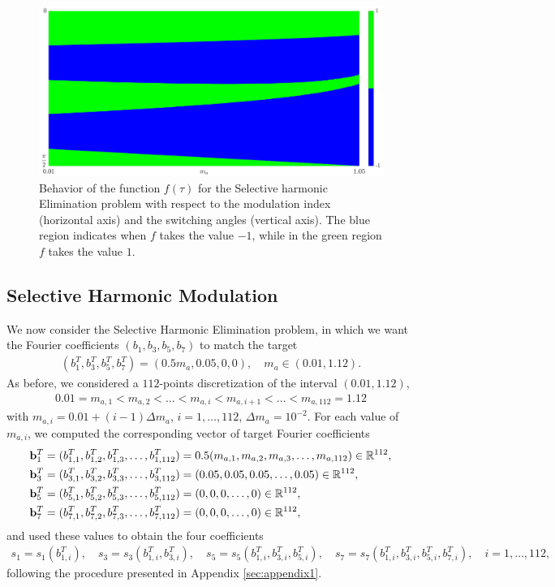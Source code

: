 \documentclass[a4paper]{article}
\numberwithin{equation}{section}
\begin{document}
\begin{figure}
	\centering 
	\includegraphics[scale=0.25]{anglesElimination}
	\caption{Behavior of the function $f(\tau)$ for the Selective harmonic Elimination problem with respect to the modulation index (horizontal axis) and the switching angles (vertical axis). The blue region indicates when $f$ takes the value $-1$, while in the green region $f$ takes the value $1$.}\label{fig:anglesElimination}
\end{figure}

\subsection{Selective Harmonic Modulation}

We now consider the Selective Harmonic Elimination problem, in which we want the Fourier coefficients $(b_1,b_3,b_5,b_7)$ to match the target 
\begin{align*}
	(b_1^T,b_3^T,b_5^T,b_7^T) = (0.5m_a,0.05,0,0), \quad m_a\in (0.01,1.12).	
\end{align*}
As before, we considered a $112$-points discretization of the interval $(0.01,1.12)$, 
\begin{align*}
	0.01 = m_{a,1}< m_{a,2} < \ldots < m_{a,i} < m_{a,i+1} < \ldots < m_{a,112} = 1.12
\end{align*}
with $m_{a,i} = 0.01 + (i-1)\Delta m_a$, $i=1,\ldots,112$, $\Delta m_a=10^{-2}$. For each value of $m_{a,i}$, we computed the corresponding vector of target Fourier coefficients
\begin{align*}
	&{\bf{b}}^T_1 =(b_{1,1}^T,b_{1,2}^T,b_{1,3}^T,\ldots, b_{1,112}^T) = 0.5(m_{a,1},m_{a,2},m_{a,3},\ldots,m_{a,112})\in\mathbb{R}^{112},
	\\
	&{\bf{b}}^T_3 =(b_{3,1}^T,b_{3,2}^T,b_{3,3}^T,\ldots, b_{3,112}^T) = (0.05,0.05,0.05,\ldots,0.05)\in\mathbb{R}^{112},
	\\
	&{\bf{b}}^T_5 =(b_{5,1}^T,b_{5,2}^T,b_{5,3}^T,\ldots, b_{5,112}^T) = (0,0,0,\ldots,0)\in\mathbb{R}^{112},
	\\
	&{\bf{b}}^T_7 =(b_{7,1}^T,b_{7,2}^T,b_{7,3}^T,\ldots, b_{7,112}^T) = (0,0,0,\ldots,0)\in\mathbb{R}^{112},
\end{align*}
and used these values to obtain the four coefficients 
\begin{align*}
	s_1 = s_1(b_{1,i}^T), \quad s_3 = s_3(b_{1,i}^T,b_{3,i}^T), \quad s_5 = s_5(b_{1,i}^T,b_{3,i}^T,b_{5,i}^T), \quad s_7 = s_7(b_{1,i}^T,b_{3,i}^T,b_{5,i}^T,b_{7,i}^T), \quad i = 1,\ldots, 112,
\end{align*}
following the procedure presented in Appendix \ref{sec:appendix1}.
\end{document}
